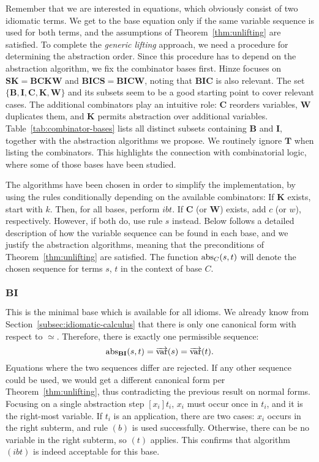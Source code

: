 Remember that we are interested in equations, which obviously consist of two
idiomatic terms.
We get to the base equation only if the same variable sequence is used for both
terms, and the assumptions of Theorem~\ref{thm:unlifting} are satisfied.
To complete the \emph{generic lifting} approach, we need a procedure for
determining the abstraction order.
Since this procedure has to depend on the abstraction algorithm, we fix the
combinator bases first.
Hinze focuses on $\mathbf{SK = BCKW}$ and $\mathbf{BICS = BICW}$, noting
that $\mathbf{BIC}$ is also relevant.
The set $\{\mathbf{B,I,C,K,W}\}$ and its subsets seem to be a good starting
point to cover relevant cases.
The additional combinators play an intuitive role:
$\mathbf{C}$ reorders variables, $\mathbf{W}$ duplicates them, and $\mathbf{K}$
permits abstraction over additional variables.
Table~\ref{tab:combinator-bases} lists all distinct subsets containing
$\mathbf{B}$ and $\mathbf{I}$, together with the abstraction algorithms we
propose.
We routinely ignore $\mathbf{T}$ when listing the combinators.
This highlights the connection with combinatorial logic, where some of those
bases have been studied.

The algorithms have been chosen in order to simplify the implementation, by
using the rules conditionally depending on the available combinators:
If $\mathbf{K}$ exists, start with $k$.
Then, for all bases, perform $ibt$.
If $\mathbf{C}$ (or $\mathbf{W}$) exists, add $c$ (or $w$), respectively.
However, if both do, use rule $s$ instead.
Below follows a detailed description of how the variable sequence can be found
in each base, and we justify the abstraction algorithms, meaning that the
preconditions of Theorem~\ref{thm:unlifting} are satisfied.
The function $\operatorname{abs}_C(s,t)$ will denote the chosen sequence for terms $s$, $t$
in the context of base $C$.

\subsubsection*{$\mathbf{BI}$}\label{subsec:base-bi}

This is the minimal base which is available for all idioms.
We already know from Section~\ref{subsec:idiomatic-calculus} that there is only
one canonical form with respect to $\simeq$.
Therefore, there is exactly one permissible sequence:
\[ \operatorname{abs}_\mathbf{BI}(s,t) = \overrightarrow{\operatorname{var}}(s) = \overrightarrow{\operatorname{var}}(t). \]
Equations where the two sequences differ are rejected.
If any other sequence could be used, we would get a different canonical form
per Theorem~\ref{thm:unlifting}, thus contradicting the previous result on
normal forms.
Focusing on a single abstraction step $[x_i]t_i$, $x_i$ must occur once in
$t_i$, and it is the right-most variable.
If $t_i$ is an application, there are two cases:
$x_i$ occurs in the right subterm, and rule $(b)$ is used successfully.
Otherwise, there can be no variable in the right subterm, so $(t)$ applies.
This confirms that algorithm $(ibt)$ is indeed acceptable for this base.

